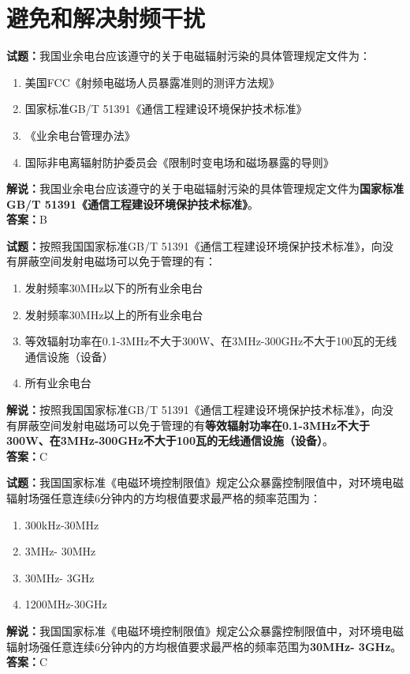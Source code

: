\documentclass{ctexbook}
\begin{document}
\chapter{避免和解决射频干扰}

\newpage

\textbf{试题：}我国业余电台应该遵守的关于电磁辐射污染的具体管理规定文件为：
\begin{enumerate}[leftmargin=3em]
  \item 美国FCC《射频电磁场人员暴露准则的测评方法规》
  \item 国家标准GB/T 51391《通信工程建设环境保护技术标准》
  \item 《业余电台管理办法》
  \item 国际非电离辐射防护委员会《限制时变电场和磁场暴露的导则》
\end{enumerate}
\noindent\textbf{解说：}我国业余电台应该遵守的关于电磁辐射污染的具体管理规定文件为\textbf{国家标准GB/T 51391《通信工程建设环境保护技术标准》}。\\\textbf{答案：}B

\vspace{1em}

\textbf{试题：}按照我国国家标准GB/T 51391《通信工程建设环境保护技术标准》，向没有屏蔽空间发射电磁场可以免于管理的有：
\begin{enumerate}[leftmargin=3em]
  \item 发射频率30\unit{\MHz}以下的所有业余电台
  \item 发射频率30\unit{\MHz}以上的所有业余电台
  \item 等效辐射功率在0.1-3\unit{\MHz}不大于300W、在3\unit{\MHz}-300\unit{\GHz}不大于100瓦的无线通信设施（设备）
  \item 所有业余电台
\end{enumerate}
\noindent\textbf{解说：}按照我国国家标准GB/T 51391《通信工程建设环境保护技术标准》，向没有屏蔽空间发射电磁场可以免于管理的有\textbf{等效辐射功率在0.1-3\unit{\MHz}不大于300W、在3\unit{\MHz}-300\unit{\GHz}不大于100瓦的无线通信设施（设备）}。\\\textbf{答案：}C

\vspace{1em}

\textbf{试题：}我国国家标准《电磁环境控制限值》规定公众暴露控制限值中，对环境电磁辐射场强任意连续6分钟内的方均根值要求最严格的频率范围为：
\begin{enumerate}[leftmargin=3em]
  \item 300\unit{\kHz}-30\unit{\MHz}
  \item 3\unit{\MHz}- 30\unit{\MHz}
  \item 30\unit{\MHz}- 3\unit{\GHz}
  \item 1200\unit{\MHz}-30\unit{\GHz}
\end{enumerate}
\noindent\textbf{解说：}我国国家标准《电磁环境控制限值》规定公众暴露控制限值中，对环境电磁辐射场强任意连续6分钟内的方均根值要求最严格的频率范围为\textbf{30\unit{\MHz}- 3\unit{\GHz}}。\\\textbf{答案：}C
\end{document}
